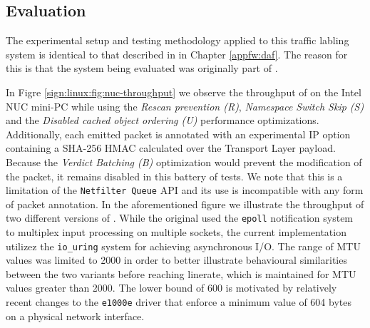\subsection{Evaluation}
\label{sign:linux:evaluation}

The experimental setup and testing methodology applied to this traffic labling system is identical to that described in in Chapter \ref{appfw:daf}. The reason for this is that the system being evaluated was originally part of \daf{}.



In Figre \ref{sign:linux:fig:nuc-throughput} we observe the throughput of \daf{} on the Intel NUC mini-PC while using the \textit{Rescan prevention (R)}, \textit{Namespace Switch Skip (S)} and the \textit{Disabled cached object ordering (U)} performance optimizations. Additionally, each emitted packet is annotated with an experimental IP option containing a SHA-256 HMAC calculated over the Transport Layer payload. Because the \textit{Verdict Batching (B)} optimization would prevent the modification of the packet, it remains disabled in this battery of tests. We note that this is a limitation of the \texttt{Netfilter Queue} API and its use is incompatible with any form of packet annotation. In the aforementioned figure we illustrate the throughput of two different versions of \daf{}. While the original used the \texttt{epoll} notification system to multiplex input processing on multiple sockets, the current implementation utilizez the \texttt{io\_uring} system for achieving asynchronous I/O. The range of MTU values was limited to 2000 in order to better illustrate behavioural similarities between the two variants before reaching linerate, which is maintained for MTU values greater than 2000. The lower bound of 600 is motivated by relatively recent changes to the \texttt{e1000e} driver that enforce a minimum value of 604 bytes on a physical network interface.



